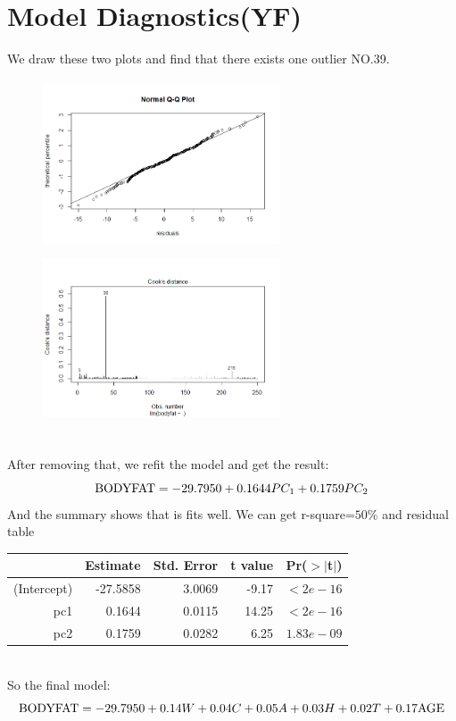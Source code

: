 \documentclass[12pt]{article}
\begin{document}
\section{\sffamily Model Diagnostics(YF)}
We draw these two plots and find that there exists one outlier NO.39.
\begin{figure}[ht]
	\centering
	\includegraphics[width=7cm,height=5cm]{2.png}
	\includegraphics[width=7cm,height=5cm]{3.png}  
\end{figure}\\
After removing that, we refit the model and get the result:
$${\rm BODYFAT} = -29.7950 + 0.1644PC_1 + 0.1759PC_2$$
And the summary shows that is fits well.
We can get r-square=$50\%$ and residual table
\begin{table}[ht]
    \centering
    \begin{tabular}{rrrrr}
      \hline
     & Estimate & Std. Error & t value & Pr($>$$|$t$|$) \\ 
      \hline
    (Intercept) & -27.5858 & 3.0069 & -9.17 & $<2e-16$ \\ 
      pc1 & 0.1644 & 0.0115 & 14.25 & $<2e-16$  \\ 
      pc2 & 0.1759 & 0.0282 & 6.25 & $1.83e-09$ \\ 
       \hline
    \end{tabular}
    \end{table}\\
So the final model: $${\rm BODYFAT} = -29.7950 + 0.14W + 0.04C + 0.05A+ 0.03H +0.02T + 0.17{\rm AGE}$$
\end{document}
